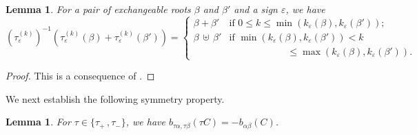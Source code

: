 \documentclass[letterpaper]{amsart}
\numberwithin{equation}{section}
\newtheorem{lemma}[theorem]{Lemma}
\theoremstyle{definition}
\def\subplus{{\,\uplus\,} }
\begin{document}
\begin{lemma} 
\label{lem:cluster-expansion-properties-6} 
For a pair of exchangeable roots $\beta$ and $\beta'$ and a sign 
$\varepsilon$, we have 
\[ 
(\tau^{(k)}_\varepsilon)^{-1} 
(\tau^{(k)}_\varepsilon (\beta)+\tau^{(k)}_\varepsilon (\beta')) 
= 
\begin{cases} 
\beta + \beta' & 
\text{if $0 \leq k \leq \min(k_\varepsilon(\beta),k_\varepsilon(\beta'))$;} \\[.05in] 
\beta \subplus \beta' & 
\text{if $\min(k_\varepsilon(\beta),k_\varepsilon(\beta')) 
< k$} \\ 
&\hspace{1in}\leq \max(k_\varepsilon(\beta),k_\varepsilon(\beta')). 
\end{cases} 
\] 
\end{lemma} 
 
\begin{proof} 
This is a consequence of \cite[Lemma~3.2]{cfz}. 
\end{proof} 
 
 
 
We next establish the following symmetry property. 
 
\begin{lemma} 
\label{lem:B-are-tau-invariant} 
For $\tau\in\{\tau_+\,,\tau_-\}$, we have 
$b_{\tau \alpha,\tau\beta}(\tau C) = - b_{\alpha\beta}(C)$. 
\end{lemma} 
 
\pagebreak[2] 
 
\end{document}
